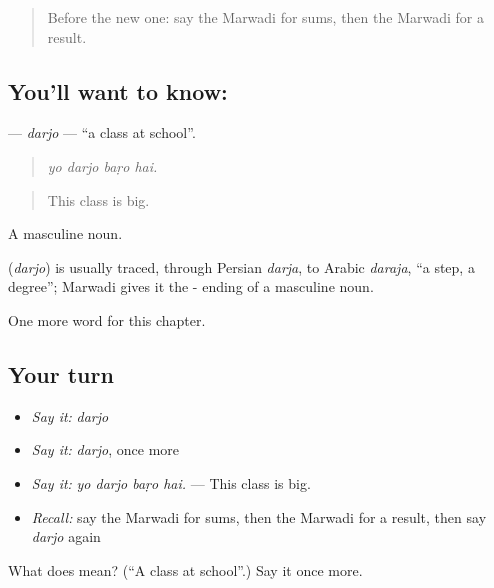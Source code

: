 \begin{quote}
Before the new one: say the Marwadi for sums, then the Marwadi for a result.
\end{quote}

\subsection*{You'll want to know: }
\textbf{} — \emph{darjo} — \textquotedblleft{}a class at school\textquotedblright{}.

\begin{quote}
   
\end{quote}

\begin{quote}
\emph{yo darjo baṛo hai.}
\end{quote}

\begin{quote}
This class is big.
\end{quote}

A masculine noun.

\begin{cousinweb}
\textbf{} (\emph{darjo}) is usually traced, through Persian \emph{darja}, to Arabic \emph{daraja}, \textquotedblleft{}a step, a degree\textquotedblright{}; Marwadi gives it the - ending of a masculine noun.
\end{cousinweb}

\begin{grammarlens}[title={What you've built}]
One more word for this chapter.
\end{grammarlens}

\subsection*{Your turn}
\begin{itemize}
\raggedright
  \item \emph{Say it:} \emph{darjo}
  \item \emph{Say it:} \emph{darjo}, once more
  \item \emph{Say it:} \emph{yo darjo baṛo hai.} — This class is big.
  \item \emph{Recall:} say the Marwadi for sums, then the Marwadi for a result, then say \emph{darjo} again
\end{itemize}

\begin{tcolorbox}[breakable,colback=teal!4,colframe=teal!35!black,title={Before you move on}]
What does  mean? (\textquotedblleft{}A class at school\textquotedblright{}.) Say it once more.
\end{tcolorbox}
